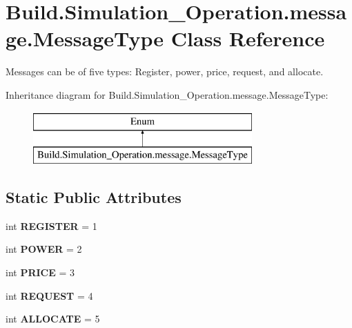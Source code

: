\hypertarget{class_build_1_1_simulation___operation_1_1message_1_1_message_type}{}\section{Build.\+Simulation\+\_\+\+Operation.\+message.\+Message\+Type Class Reference}
\label{class_build_1_1_simulation___operation_1_1message_1_1_message_type}


Messages can be of five types\+: Register, power, price, request, and allocate.  


Inheritance diagram for Build.\+Simulation\+\_\+\+Operation.\+message.\+Message\+Type\+:\begin{figure}[H]
\begin{center}
\leavevmode
\includegraphics[height=2.000000cm]{class_build_1_1_simulation___operation_1_1message_1_1_message_type}
\end{center}
\end{figure}
\subsection*{Static Public Attributes}
\begin{DoxyCompactItemize}
\item 
\mbox{\label{class_build_1_1_simulation___operation_1_1message_1_1_message_type_a518eb650dfc94f31142b07f0caa5ac09}} 
int {\bfseries R\+E\+G\+I\+S\+T\+ER} = 1
\item 
\mbox{\label{class_build_1_1_simulation___operation_1_1message_1_1_message_type_abc56c6f1776929c18f8b6fc8b74001fe}} 
int {\bfseries P\+O\+W\+ER} = 2
\item 
\mbox{\label{class_build_1_1_simulation___operation_1_1message_1_1_message_type_a68afec66af746b54718007bf8d059943}} 
int {\bfseries P\+R\+I\+CE} = 3
\item 
\mbox{\label{class_build_1_1_simulation___operation_1_1message_1_1_message_type_a60bbbb6d2d9a92e2021e20485288c011}} 
int {\bfseries R\+E\+Q\+U\+E\+ST} = 4
\item 
\mbox{\label{class_build_1_1_simulation___operation_1_1message_1_1_message_type_aa0b29a936d5282d2da064604df74db7b}} 
int {\bfseries A\+L\+L\+O\+C\+A\+TE} = 5
\end{DoxyCompactItemize}


